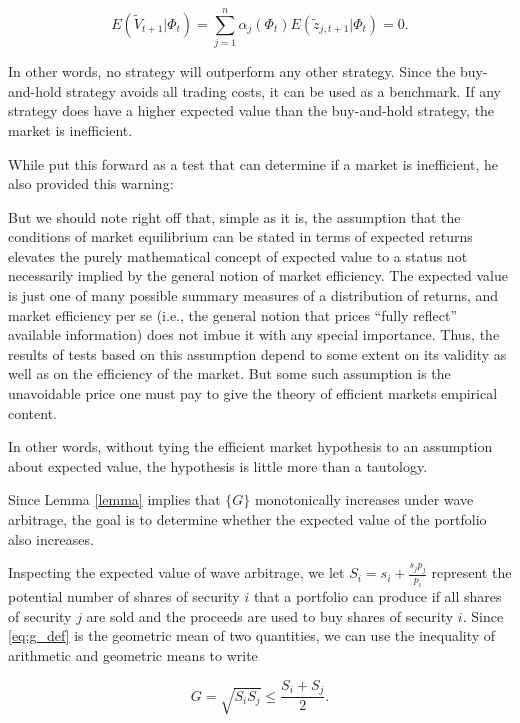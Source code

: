 \documentclass{article}
\begin{document}
\begin{equation}
\label{eq:excess_returns}
  E(\tilde{V}_{t+1} | \Phi_t)
    = \sum_{j=1}^n \alpha_j (\Phi_t) E(\tilde{z}_{j,t+1} | \Phi_t)
    = 0.
\end{equation}

In other words, no strategy will outperform any other strategy. Since the
buy-and-hold strategy avoids all trading costs, it can be used as a benchmark.
If any strategy does have a higher expected value than the buy-and-hold
strategy, the market is inefficient.

While \citet{fama1970} put this forward as a test that can determine if a
market is inefficient, he also provided this warning:

\begin{displayquote}
  But we should note right off that, simple as it is, the assumption that the
  conditions of market equilibrium can be stated in terms of expected returns
  elevates the purely mathematical concept of expected value to a status not
  necessarily implied by the general notion of market efficiency. The expected
  value is just one of many possible summary measures of a distribution of
  returns, and market efficiency per se (i.e., the general notion that prices
  ``fully reflect'' available information) does not imbue it with any special
  importance. Thus, the results of tests based on this assumption depend to
  some extent on its validity as well as on the efficiency of the market. But
  some such assumption is the unavoidable price one must pay to give the theory
  of efficient markets empirical content.
\end{displayquote}

In other words, without tying the efficient market hypothesis to an assumption
about expected value, the hypothesis is little more than a tautology.

Since Lemma \ref{lemma} implies that $\{G\}$ monotonically increases under wave
arbitrage, the goal is to determine whether the expected value of the portfolio
also increases.

Inspecting the expected value of wave arbitrage, we let
$S_i = s_i + \frac{s_j p_j}{p_i}$ represent the potential number of shares of
security $i$ that a portfolio can produce if all shares of security $j$ are sold
and the proceeds are used to buy shares of security $i$. Since \ref{eq:g_def}
is the geometric mean of two quantities, we can use the inequality of
arithmetic and geometric means to write

\begin{equation}
  G = \sqrt{S_i S_j} \leq \frac{S_i + S_j}{2}.
\end{equation}
\end{document}
